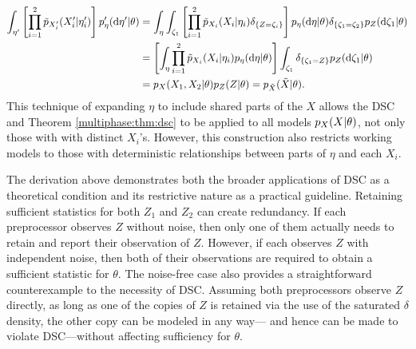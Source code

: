 \begin{align*}
\int_{\eta'}\left[ \prod_{i=1}^2 \tilde p_{X_i'}(X_i' |\eta_i')  \right]p_\eta'(\mathrm{d} \eta' | \theta) & = \int_\eta\int_{\zeta_1}\left[ \prod_{i=1}^2 \tilde p_{X_i}(X_i |\eta_i)\delta_{\{Z=\zeta_i\}}  \right]p_\eta(\mathrm{d} \eta | \theta)
\delta_{\{\zeta_1=\zeta_2\}} p_{Z}(\mathrm{d}\zeta_1|\theta)  \\
& =  \left[ \int_\eta\prod_{i=1}^2 \tilde p_{X_i}(X_i |\eta_i)  p_\eta(\mathrm{d} \eta | \theta)\right] \int_{\zeta_1}
\delta_{\{\zeta_1=Z\}} p_{Z}(\mathrm{d}\zeta_1|\theta) \\
& =p_{X_{}}(X_1, X_2|\theta)p_{Z}(Z|\theta)=p_{\tilde X}(\tilde X|\theta).
\end{align*}
This technique of expanding $\eta$ to include shared parts of the $X$ allows the DSC and Theorem \ref{multiphase:thm:dsc} to be applied to all models $p_X(X | \theta)$, not only those with with distinct $X_i$'s.
However, this construction also restricts working models to those with deterministic relationships between parts of $\eta$ and each $X_i$.

The derivation above demonstrates both the broader applications of DSC as a theoretical condition and its restrictive nature as a practical guideline. Retaining sufficient statistics for both $Z_1$ and $Z_2$ can create redundancy.
%
If each preprocessor observes $Z$ without noise, then only one of them actually needs to retain and report their observation of $Z$.
However, if each observes $Z$ with independent noise, then both of their observations are required to obtain a sufficient statistic for $\theta$.
%
The noise-free case also provides a straightforward counterexample to the necessity of DSC. Assuming both preprocessors observe $Z$ directly, as long as one of the copies of $Z$ is retained via the use of the saturated  $\delta$ density, the other copy can be modeled in any way--- and hence can be made to violate DSC---without affecting sufficiency for $\theta$.

